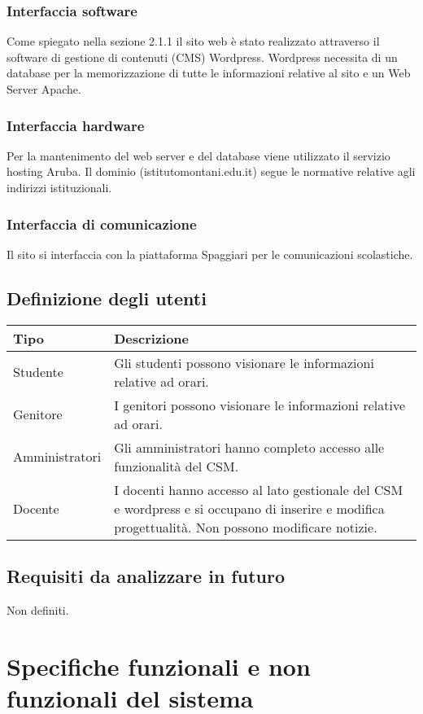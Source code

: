 \documentclass{article}
\begin{document}
	\subsubsection{\textbf{Interfaccia software}}
	Come spiegato nella sezione 2.1.1 il sito web è stato realizzato attraverso il software di gestione di contenuti (CMS) Wordpress. Wordpress necessita di un database per la memorizzazione di tutte le informazioni relative al sito e un Web Server Apache.  
	
	\subsubsection{\textbf{Interfaccia hardware}}
	Per la mantenimento del web server e del database viene utilizzato il servizio hosting Aruba. Il dominio (istitutomontani.edu.it) segue le normative relative agli indirizzi istituzionali.
	
	\subsubsection{\textbf{Interfaccia di comunicazione}}
	Il sito si interfaccia con la piattaforma Spaggiari per le comunicazioni scolastiche.	

	\subsection{\textbf{Definizione degli utenti}}
\begin{tabular}{ |p{3cm}|p{8cm}|  }
	\hline
	\textbf{Tipo}& \textbf{Descrizione}\\
	\hline
	Studente   & Gli studenti possono visionare le informazioni relative ad orari. \\
	\hline
	Genitore   & I genitori possono visionare le informazioni relative ad orari.
	\\
	\hline
	Amministratori  & Gli amministratori hanno completo accesso alle funzionalità del CSM.\\	
	\hline
	Docente & I docenti hanno accesso al lato gestionale del CSM e wordpress e si occupano di inserire e modifica progettualità. Non possono modificare notizie.\\
	\hline
\end{tabular}

	\subsection{\textbf{Requisiti da analizzare in futuro}}
Non definiti.	
\clearpage
	\Large \section{\textbf{Specifiche funzionali e non funzionali del sistema}} 
\end{document}
